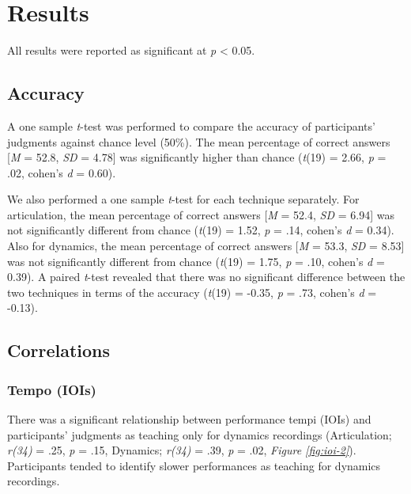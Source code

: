 \documentclass[
  man,floatsintext]{apa6}
\begin{document}
\hypertarget{results-1}{%
\section{Results}\label{results-1}}

All results were reported as significant at \emph{p} \textless{} 0.05.

\hypertarget{accuracy-2}{%
\subsection{Accuracy}\label{accuracy-2}}

A one sample \emph{t}-test was performed to compare the accuracy of participants' judgments against chance level (50\%). The mean percentage of correct answers {[}\emph{M} = 52.8, \emph{SD} = 4.78{]} was significantly higher than chance (\emph{t}(19) = 2.66, \emph{p} = .02, cohen's \emph{d} = 0.60).

We also performed a one sample \emph{t}-test for each technique separately. For articulation, the mean percentage of correct answers {[}\emph{M} = 52.4, \emph{SD} = 6.94{]} was not significantly different from chance (\emph{t}(19) = 1.52, \emph{p} = .14, cohen's \emph{d} = 0.34). Also for dynamics, the mean percentage of correct answers {[}\emph{M} = 53.3, \emph{SD} = 8.53{]} was not significantly different from chance (\emph{t}(19) = 1.75, \emph{p} = .10, cohen's \emph{d} = 0.39). A paired \emph{t}-test revealed that there was no significant difference between the two techniques in terms of the accuracy (\emph{t}(19) = -0.35, \emph{p} = .73, cohen's \emph{d} = -0.13).

\hypertarget{correlations-1}{%
\subsection{Correlations}\label{correlations-1}}

\hypertarget{tempo-iois-1}{%
\subsubsection{Tempo (IOIs)}\label{tempo-iois-1}}

There was a significant relationship between performance tempi (IOIs) and participants' judgments as teaching only for dynamics recordings (Articulation; \emph{r(34)} = .25, \emph{p} = .15, Dynamics; \emph{r(34)} = .39, \emph{p} = .02, \emph{Figure \ref{fig:ioi-2}}). Participants tended to identify slower performances as teaching for dynamics recordings.
\end{document}
